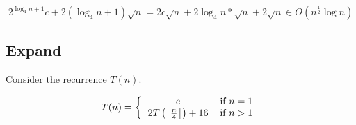 \documentclass[paper=a4, fontsize=11pt]{scrartcl}
\numberwithin{equation}{section}		%
\numberwithin{figure}{section}			%
\numberwithin{table}{section}				%
\begin{document}
$$2^{\log_4 n + 1}c + 2(\log_4 n + 1)\sqrt{n}=2c\sqrt{n} + 2\log_4 n * \sqrt{n} + 2\sqrt{n} \in O(n^{\frac{1}{2}}\log n)$$




\newpage

\subsection{Expand}

Consider the recurrence $T(n)$.  

\[
T(n) = \left\{
\begin{tabular}{cc}
c & \text{if} $n=1$ \\
$2T\left(\left\lfloor\frac{n}{4}\right\rfloor\right)+16$ & \text{if} $n>1$ \\
\end{tabular}\right.
\]
\end{document}
